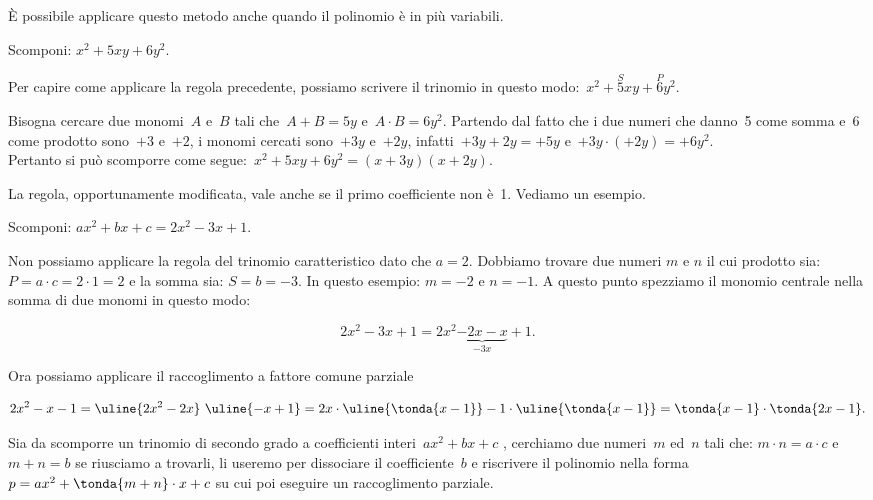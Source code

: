 È possibile applicare questo metodo anche quando il
polinomio è in più variabili.

\begin{esempio}{}{}
Scomponi: \(x^2+5xy+6y^{2}\).

Per capire come applicare la regola precedente, possiamo scrivere il
trinomio in questo modo:~\(x^2+\overset{S}{5}xy+\overset{P}{6}y{^{2}}\).

Bisogna cercare due monomi~\(A\) e~\(B\) tali che~\(A+B=5y\)
e~\(A\cdot B=6y^{2}\). Partendo dal fatto che i due numeri che danno~5
come somma e~6 come prodotto sono~\(+3\) e~\(+2\), i monomi cercati 
sono~\(+3y\) e~\(+2y\), infatti~\(+3y+2y=+5y\) 
e~\(+3y \cdot (+2y) = +6y^{2}\).\\
Pertanto si può scomporre come segue:~\(x^2+5xy+6y^{2}=(x+3y)(x+2y)\).
\end{esempio}

La regola, opportunamente modificata, vale anche se il primo
coefficiente non è~1. Vediamo un esempio.

\begin{esempio}{}{}
Scomponi: \(ax^2+bx+c=2x^2-3x+1\).

Non possiamo applicare la regola del trinomio caratteristico dato che 
\(a=2\).
Dobbiamo trovare due numeri \(m\) e \(n\) il cui prodotto sia: 
\(P = a \cdot c = 2 \cdot 1 = 2\) e la somma sia: \(S = b = -3\).
In questo esempio: \(m = -2\) e \(n = -1\).
A questo punto spezziamo il monomio centrale nella somma di due monomi 
in questo modo:

\vspace{-1.0em}
\[2x^2-3x+1=2x^2\underbrace{-2x-x}_{-3x}+1.\]

Ora possiamo applicare il raccoglimento a fattore comune parziale

\vspace{-1.0em}
\[2x^2-x-1=
\uline{2x^2-2x}~\uline{-x+1}=
2x \cdot \uline{\tonda{x-1}}-1 \cdot \uline{\tonda{x-1}}=
\tonda{x-1}\cdot \tonda{2x-1}.\]
\end{esempio}

\begin{procedura}{}{}
Sia da scomporre un trinomio di secondo grado a coefficienti 
interi~\(ax^2+bx+c\)
, cerchiamo due numeri~\(m\) ed~\(n\) tali che: \quad 
\(m \cdot n = a \cdot c\) \quad 
e \quad 
\(m+n=b\)  \quad
se riusciamo a trovarli, li useremo per dissociare
il coefficiente~\(b\) e riscrivere il polinomio nella 
forma~\(p=ax^2+\tonda{m+n}\cdot x+c\)
su cui poi eseguire un raccoglimento parziale.
\end{procedura}

